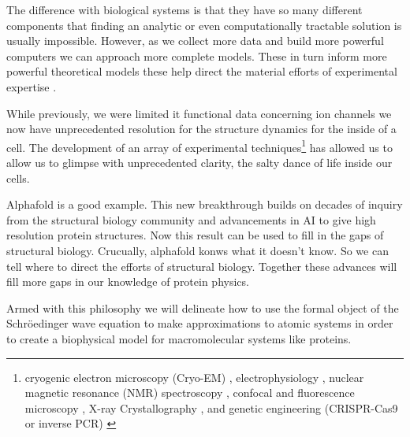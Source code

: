 The difference with biological systems is that they have so many different components that finding an analytic or even computationally tractable solution is usually impossible. However, as we collect more data and build more powerful computers we can approach more complete models. These in turn inform more powerful theoretical models these help direct the material efforts of experimental expertise . 

While previously, we were limited it functional data concerning ion channels we now have unprecedented resolution for the structure dynamics for the inside of a cell. The development of an array of experimental techniques\footnote{cryogenic electron microscopy (Cryo-EM) \cite{cheng2015}, electrophysiology \cite{aidley1996}, nuclear magnetic resonance (NMR) spectroscopy \cite{marion2013}, confocal and fluorescence microscopy \cite{sanderson2014}, X-ray Crystallography \cite{frauenfelder2010}, and genetic engineering (CRISPR-Cas9 or inverse PCR) \cite{silva2017, crispr2019}} has allowed us to allow us to glimpse with unprecedented clarity, the salty dance of life inside our cells.

Alphafold is a good example. This new breakthrough builds on decades of inquiry from the structural biology community and advancements in AI to give high resolution protein structures. Now this result can be used to fill in the gaps of structural biology. Crucually, alphafold konws what it doesn't know. So we can tell where to direct the efforts of structural biology. Together these advances will fill more gaps in our knowledge of protein physics. 

Armed with this philosophy we will delineate how to use the formal object of the Schr\"oedinger wave equation to make approximations to atomic systems in order to create a biophysical model for macromolecular systems like proteins.
